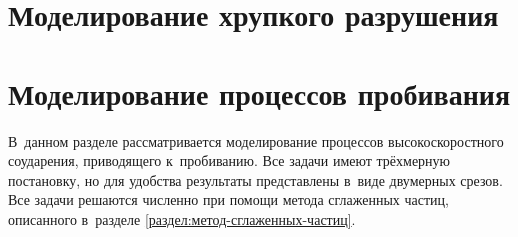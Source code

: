 \documentclass[a4paper,14pt]{extarticle}
\begin{document}
    

    \setcounter{page}{2}
    \tableofcontents

    \newpage
    

    \newpage
    

    \newpage
    

    \newpage
    \section{Моделирование хрупкого разрушения}

    
    
    

    \newpage
    \section{Моделирование процессов пробивания}

    В~данном разделе рассматривается моделирование процессов высокоскоростного соударения, приводящего к~пробиванию. Все
    задачи имеют трёхмерную постановку, но для удобства результаты представлены в~виде двумерных срезов. Все задачи
    решаются численно при помощи метода сглаженных частиц, описанного в~разделе \ref{раздел:метод-сглаженных-частиц}.

    
    

    \newpage
    

    \newpage
    
\end{document}

